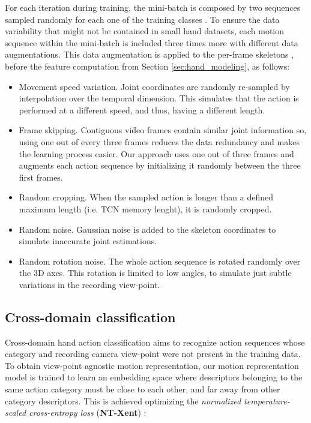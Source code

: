 \documentclass[letterpaper, 10 pt, conference]{ieeeconf}
\begin{document}
For each iteration during training, the mini-batch is composed by two sequences sampled randomly for each one of the training classes . 
To ensure the data variability that might not be contained in small hand datasets, each motion sequence within the mini-batch is included three times more with different data augmentations. This data augmentation is applied to the per-frame skeletons , before the feature computation from Section \ref{sec:hand_modeling}, as follows:
\begin{itemize}
    \item Movement speed variation. Joint coordinates are randomly re-sampled by interpolation over the temporal dimension. This simulates that the action is performed at a different speed, and thus, having a different length.
    \item Frame skipping. Contiguous video frames contain similar joint information so, using one out of every three frames 
    reduces the data redundancy and makes the learning process easier. Our approach uses one out of three frames and augments each action sequence by initializing it randomly between the three first frames.
    \item Random cropping. When the sampled action is longer than a defined maximum length (i.e. TCN memory lenght), it is randomly cropped.
    \item Random noise. Gaussian noise is added to the skeleton coordinates to simulate inaccurate joint estimations.
    \item Random rotation noise. The whole action sequence is rotated randomly over the 3D axes. This rotation is limited to low angles, to simulate just subtle variations in the recording view-point. 
\end{itemize}




\subsection{Cross-domain classification}\label{sec:xdom}

Cross-domain hand action classification aims to recognize action sequences whose category and recording camera view-point were not present in the training data.  To obtain view-point agnostic motion representation, our motion representation model  is trained to learn an embedding space where descriptors belonging to the same action category must be close to each other, and far away from other category descriptors.
This is achieved optimizing 
the \textit{normalized temperature-scaled cross-entropy loss} (\textbf{NT-Xent}) \cite{chen2020simple}:
\end{document}
